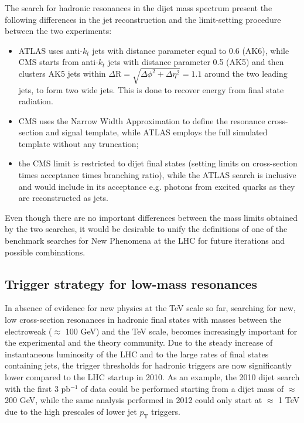 \documentclass{PoS}
\newcommand{\antikt}{anti-$k_t$}
\begin{document}
The search for hadronic resonances in the dijet mass spectrum present 
the following differences in the jet reconstruction and the 
limit-setting procedure between the two experiments:
\begin{itemize}
\item ATLAS uses \antikt{} jets with distance parameter equal to 0.6 (AK6), while 
CMS starts from  \antikt{} jets with distance parameter 0.5
(AK5) and then clusters AK5 jets within $\Delta\mbox{R}=\sqrt{\Delta\phi^2+\Delta\eta^2}=1.1$ around the 
two leading jets, to form two wide jets. This is done to recover energy from final 
state radiation.
 \item CMS uses the Narrow Width Approximation to define the resonance cross-section and signal template, 
while ATLAS employs the full simulated template without any truncation;
 \item the CMS limit is restricted to dijet final states (setting limits 
on cross-section times acceptance times branching ratio), while the ATLAS search is 
inclusive and would include in its acceptance e.g. photons from excited quarks 
as they are reconstructed as jets. 
\end{itemize}
Even though there are no important differences between the mass limits obtained by the two searches, 
it would be desirable to unify the definitions of one of the benchmark searches for New Phenomena at the LHC
for future iterations and possible combinations. 

\subsection{Trigger strategy for low-mass resonances}
In absence of evidence for new physics at the TeV scale so far, 
searching for new, low cross-section resonances in hadronic final states with masses 
between the electroweak ($\approx$ 100 GeV) and the TeV scale, 
becomes increasingly important for the experimental and the theory community.
Due to the steady increase of instantaneous luminosity of the LHC and to 
the large rates of final states containing jets, 
the trigger thresholds for hadronic triggers are now significantly 
lower compared to the LHC startup in 2010. As an example, the 2010 
dijet search with the first 3 pb$^{-1}$ of data could be performed 
starting from a dijet mass of $\approx$ 200 GeV, 
while the same analysis performed in 2012 
could only start at $\approx$ 1 TeV due to the high 
prescales of lower jet $p_\mathrm{T}$ triggers.
\end{document}
